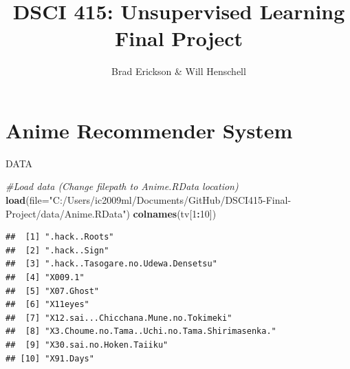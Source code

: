 \documentclass[
  ignorenonframetext,
]{beamer}
\title{DSCI 415: Unsupervised Learning Final Project}
\author{Brad Erickson \& Will Henschell}
\date{}
\newenvironment{Shaded}{\begin{snugshade}}{\end{snugshade}}
\newcommand{\CommentTok}[1]{\textcolor[rgb]{0.56,0.35,0.01}{\textit{#1}}}
\newcommand{\DataTypeTok}[1]{\textcolor[rgb]{0.13,0.29,0.53}{#1}}
\newcommand{\DecValTok}[1]{\textcolor[rgb]{0.00,0.00,0.81}{#1}}
\newcommand{\KeywordTok}[1]{\textcolor[rgb]{0.13,0.29,0.53}{\textbf{#1}}}
\newcommand{\NormalTok}[1]{#1}
\newcommand{\OperatorTok}[1]{\textcolor[rgb]{0.81,0.36,0.00}{\textbf{#1}}}
\newcommand{\StringTok}[1]{\textcolor[rgb]{0.31,0.60,0.02}{#1}}
\begin{document}
\frame{\titlepage}

\hypertarget{anime-recommender-system}{%
\section{Anime Recommender System}\label{anime-recommender-system}}

\begin{frame}[fragile]{DATA}
\protect\hypertarget{data}{}

\begin{Shaded}
\begin{Highlighting}[]
\CommentTok{#Load data (Change filepath to Anime.RData location)}
\KeywordTok{load}\NormalTok{(}\DataTypeTok{file=}\StringTok{"C:/Users/ic2009ml/Documents/GitHub/DSCI415-Final-Project/data/Anime.RData"}\NormalTok{)}
\KeywordTok{colnames}\NormalTok{(tv[}\DecValTok{1}\OperatorTok{:}\DecValTok{10}\NormalTok{])}
\end{Highlighting}
\end{Shaded}

\begin{verbatim}
##  [1] ".hack..Roots"                                 
##  [2] ".hack..Sign"                                  
##  [3] ".hack..Tasogare.no.Udewa.Densetsu"            
##  [4] "X009.1"                                       
##  [5] "X07.Ghost"                                    
##  [6] "X11eyes"                                      
##  [7] "X12.sai...Chicchana.Mune.no.Tokimeki"         
##  [8] "X3.Choume.no.Tama..Uchi.no.Tama.Shirimasenka."
##  [9] "X30.sai.no.Hoken.Taiiku"                      
## [10] "X91.Days"
\end{verbatim}

\end{frame}
\end{document}
